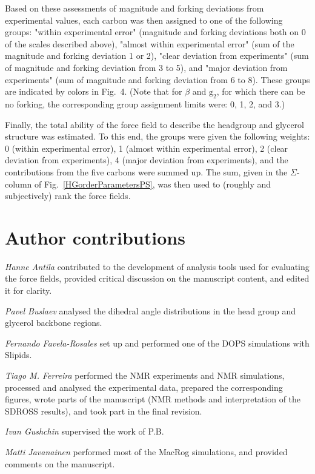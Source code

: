 \documentclass[journal=jpcbfk,manuscript=article]{achemso}
\begin{document}
\noindent Based on these assessments of magnitude and forking deviations from experimental values,
each carbon was then assigned to one of the following groups: "within experimental error"
(magnitude and forking deviations both on 0 of the scales described above),
"almost within experimental error"
(sum of the magnitude and forking deviation 1 or 2),
"clear deviation from experiments"
(sum of magnitude and forking deviation from 3 to 5), and
"major deviation from experiments"
(sum of magnitude and forking deviation from 6 to 8).
These groups are indicated by colors in Fig.~4.
(Note that for $\beta$ and $\mathrm{g_2}$, for which there can be no forking,
the corresponding group assignment limits were: 0, 1, 2, and 3.)

Finally, the total ability of the force field to describe the headgroup and
glycerol structure was estimated.
To this end, the groups were given the following weights:
0 (within experimental error),
1 (almost within experimental error),
2 (clear deviation from experiments),
4 (major deviation from experiments),
and the contributions from the five carbons were summed up.
The sum, given in the $\Sigma$-column of Fig.~\ref{HGorderParametersPS},
was then used to (roughly and subjectively) rank the force fields.

\section{Author contributions}
\noindent
{\it Hanne Antila}
contributed to the development of analysis tools used for evaluating the force fields,  provided critical discussion on the manuscript content, and edited it for clarity.

\noindent
{\it Pavel Buslaev}
analysed the dihedral angle distributions in the head group and glycerol backbone regions.

\noindent
{\it Fernando Favela-Rosales}
set up and performed one of the DOPS simulations with Slipids.

\noindent
{\it Tiago M. Ferreira}
performed the NMR experiments and NMR simulations, processed and analysed the experimental data, prepared the corresponding figures, wrote parts of the manuscript (NMR methods and interpretation of the SDROSS results), and took part in the final revision.

\noindent
{\it Ivan Gushchin}
supervised the work of P.B.

\noindent
{\it Matti Javanainen}
performed most of the MacRog simulations, and provided comments on the manuscript.
\end{document}
